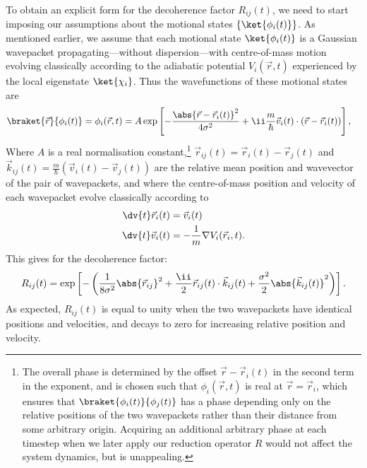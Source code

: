 To obtain an explicit form for the decoherence factor $R_{ij}(t)$, we need to start imposing our assumptions about the motional states $\{\ket{\phi_i(t)}\}$. As mentioned earlier, we assume that each motional state $\ket{\phi_i(t)}$ is a Gaussian wavepacket propagating---without dispersion---with centre-of-mass motion evolving classically according to the adiabatic potential $V_i(\vec r, t)$ experienced by the local eigenstate $\ket{\chi_i}$. Thus the wavefunctions of these motional states are
\begin{align}
\braket{\vec r}{\phi_i(t)} &= \phi_i(\vec r, t) = A\exp\left[-\frac{\abs{\vec r - \vec r_i(t)}^2}{4\sigma^2} + \ii \frac m\hbar \vec v_i(t)\cdot (\vec r - \vec r_i(t))\right],
\end{align}
Where $A$ is a real normalisation constant,\footnote{The overall phase is determined by the offset $\vec r - \vec r_i(t)$ in the second term in the exponent, and is chosen such that $\phi_i(\vec r, t)$ is real at $\vec r=\vec r_i$, which ensures that $\braket{\phi_i(t)}{\phi_j(t)}$ has a phase depending only on the relative positions of the two wavepackets rather than their distance from some arbitrary origin. Acquiring an additional arbitrary phase at each timestep when we later apply our reduction operator $\hat R$ would not affect the system dynamics, but is unappealing.} $\vec r_{ij}(t) = \vec r_i(t) - \vec r_j(t)$ and $\vec k_{ij}(t) = \frac m\hbar \left(\vec v_i(t) - \vec v_j(t)\right)$ are the relative mean position and wavevector of the pair of wavepackets, and where the centre-of-mass position and velocity of each wavepacket evolve classically according to
\begin{align}\label{eq:classical_const_a_first}
\dv{t} \vec r_i(t) &= \vec v_i(t)\\
\dv{t} \vec v_i(t) &= -\frac1m\nabla V_i(\vec r_i, t).
\label{eq:classical_const_a_second}
\end{align}
This gives for the decoherence factor:
\begin{align}\label{eq:decoherence_factor}
R_{ij}(t) = \exp\left[-\left(\frac1{8\sigma^2}\abs{\vec r_{ij}}^2
+ \frac\ii 2 \vec r_{ij}(t) \cdot \vec k_{ij}(t) + \frac{\sigma^2}{2} \abs{\vec k_{ij}(t)}^2
\right)\right].
\end{align}
As expected, $R_{ij}(t)$ is equal to unity when the two wavepackets have identical positions and velocities, and decays to zero for increasing relative position and velocity. 


